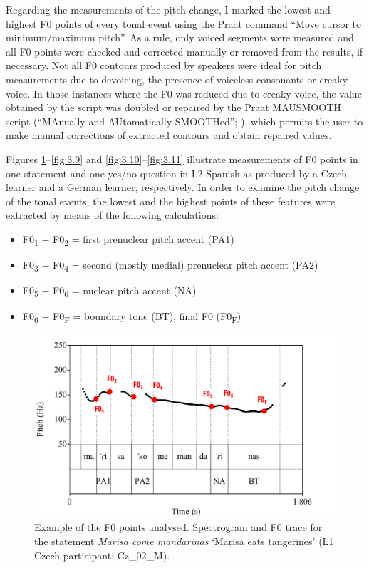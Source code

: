 \begin{sloppypar}
Regarding the measurements of the pitch change, I marked the lowest and highest F0 points of every tonal event using the Praat command “Move cursor to minimum/maximum pitch”. As a rule, only voiced segments were measured and all F0 points were checked and corrected manually or removed from the results, if necessary. Not all F0 contours produced by speakers were ideal for pitch measurements due to devoicing, the presence of voiceless consonants or creaky voice. In those instances where the F0 was reduced due to creaky voice, the value obtained by the script was doubled \citep{ArvanitiEtAl2017} or repaired by the Praat MAUSMOOTH script (“MAnually and AUtomatically SMOOTHed”; \citealt{Cangemi2015}), which permits the user to make manual corrections of extracted contours and obtain repaired values.
\end{sloppypar}


Figures \ref{fig:3.8}--\ref{fig:3.9} and \ref{fig:3.10}--\ref{fig:3.11} illustrate measurements of F0 points in one statement and one yes/no question in L2 Spanish as produced by a Czech learner and a German learner, respectively. In order to examine the pitch change of the tonal events, the lowest and the highest points of these features were extracted by means of the following calculations:\pagebreak


\begin{itemize}
\item F0\textsubscript{1} $-$ F0\textsubscript{2} = first prenuclear pitch accent (PA1)
\item F0\textsubscript{3} $-$ F0\textsubscript{4} = second (mostly medial) prenuclear pitch accent (PA2)
\item F0\textsubscript{5} $-$ F0\textsubscript{6} = nuclear pitch accent (NA)
\item F0\textsubscript{6} $-$ F0\textsubscript{F} = boundary tone (BT), final F0 (F0\textsubscript{F})
\end{itemize}


\begin{figure}[p]
\includegraphics[width=\textwidth]{figures/a03HabilMethodology-img008.pdf}
\caption{Example of the F0 points analysed. Spectrogram and F0 trace for the statement \textit{Marisa come mandarinas} ‘Marisa eats tangerines’ (L1 Czech participant; Cz\_02\_M).}
\label{fig:3.8}
\end{figure}




